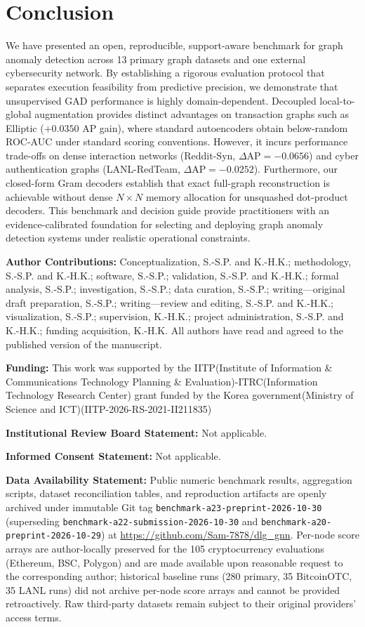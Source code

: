 \documentclass[11pt,a4paper]{article}
\newcommand{\authorcontributions}[1]{\par\medskip\noindent\textbf{Author Contributions: }#1}
\newcommand{\funding}[1]{\par\smallskip\noindent\textbf{Funding: }#1}
\newcommand{\institutionalreview}[1]{\par\smallskip\noindent\textbf{Institutional Review Board Statement: }#1}
\newcommand{\informedconsent}[1]{\par\smallskip\noindent\textbf{Informed Consent Statement: }#1}
\newcommand{\dataavailability}[1]{\par\smallskip\noindent\textbf{Data Availability Statement: }#1}
\begin{document}
\section{Conclusion}
\label{sec:conclusion}
We have presented an open, reproducible, support-aware benchmark for graph anomaly detection across 13 primary graph datasets and one external cybersecurity network. By establishing a rigorous evaluation protocol that separates execution feasibility from predictive precision, we demonstrate that unsupervised GAD performance is highly domain-dependent. Decoupled local-to-global augmentation provides distinct advantages on transaction graphs such as Elliptic ($+0.0350$ AP gain), where standard autoencoders obtain below-random ROC-AUC under standard scoring conventions. However, it incurs performance trade-offs on dense interaction networks (Reddit-Syn, $\Delta\mathrm{AP} = -0.0656$) and cyber authentication graphs (LANL-RedTeam, $\Delta\mathrm{AP} = -0.0252$). Furthermore, our closed-form Gram decoders establish that exact full-graph reconstruction is achievable without dense $N \times N$ memory allocation for unsquashed dot-product decoders. This benchmark and decision guide provide practitioners with an evidence-calibrated foundation for selecting and deploying graph anomaly detection systems under realistic operational constraints.

\vspace{6pt}

\authorcontributions{Conceptualization, S.-S.P. and K.-H.K.; methodology, S.-S.P. and K.-H.K.; software, S.-S.P.; validation, S.-S.P. and K.-H.K.; formal analysis, S.-S.P.; investigation, S.-S.P.; data curation, S.-S.P.; writing---original draft preparation, S.-S.P.; writing---review and editing, S.-S.P. and K.-H.K.; visualization, S.-S.P.; supervision, K.-H.K.; project administration, S.-S.P. and K.-H.K.; funding acquisition, K.-H.K. All authors have read and agreed to the published version of the manuscript.}

\funding{This work was supported by the IITP(Institute of Information \& Communications Technology Planning \& Evaluation)-ITRC(Information Technology Research Center) grant funded by the Korea government(Ministry of Science and ICT)(IITP-2026-RS-2021-II211835)}

\institutionalreview{Not applicable.}

\informedconsent{Not applicable.}

\dataavailability{Public numeric benchmark results, aggregation scripts, dataset reconciliation tables, and reproduction artifacts are openly archived under immutable Git tag \texttt{benchmark-a23-preprint-2026-10-30} (superseding \texttt{benchmark-a22-submission-2026-10-30} and \texttt{benchmark-a20-preprint-2026-10-29}) at \url{https://github.com/Sam-7878/dlg_gnn}. Per-node score arrays are author-locally preserved for the 105 cryptocurrency evaluations (Ethereum, BSC, Polygon) and are made available upon reasonable request to the corresponding author; historical baseline runs (280 primary, 35 BitcoinOTC, 35 LANL runs) did not archive per-node score arrays and cannot be provided retroactively. Raw third-party datasets remain subject to their original providers' access terms.}
\end{document}
